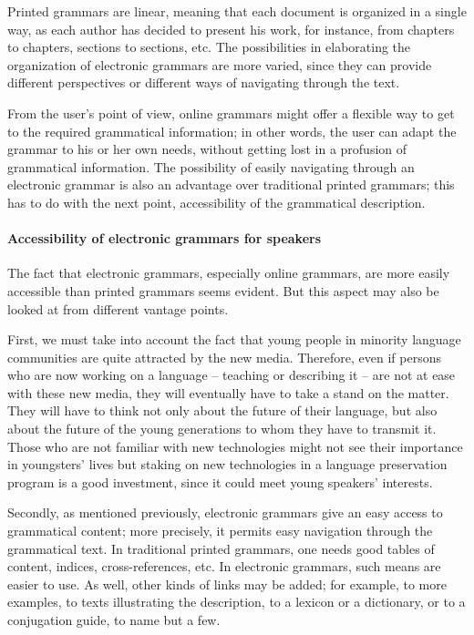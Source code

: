 Printed grammars are linear, meaning that each document is organized in a single way, as each author has decided to present his work, for instance, from chapters to chapters, sections to sections, etc. The possibilities in elaborating the organization of electronic grammars are more varied, since they can provide different perspectives or different ways of navigating through the text.

From the user's point of view, online grammars might offer a flexible way to get to the required grammatical information; in other words, the user can adapt the grammar to his or her own needs, without getting lost in a profusion of grammatical information. The possibility of easily navigating through an electronic grammar is also an advantage over traditional printed grammars; this has to do with the next point, accessibility of the grammatical description.

\paragraph{Accessibility of electronic grammars for speakers}
The fact that electronic grammars, especially online grammars, are more easily accessible than printed grammars seems evident. But this aspect may also be looked at from different vantage points.

First, we must take into account the fact that young people in minority language communities are quite attracted by the new media. Therefore, even if persons who are now working on a language -- teaching or describing it -- are not at ease with these new media, they will eventually have to take a stand on the matter. They will have to think not only about the future of their language, but also about the future of the young generations to whom they have to transmit it. Those who are not familiar with new technologies might not see their importance in youngsters' lives but staking on new technologies in a language preservation program is a good investment, since it could meet young speakers' interests.

Secondly, as mentioned previously, electronic grammars give an easy access to grammatical content; more precisely, it permits easy navigation through the grammatical text. In traditional printed grammars, one needs good tables of content, indices, cross-references, etc. In electronic grammars, such means are easier to use. As well, other kinds of links may be added; for example, to more examples, to texts illustrating the description, to a lexicon or a dictionary, or to a conjugation guide, to name but a few. 

